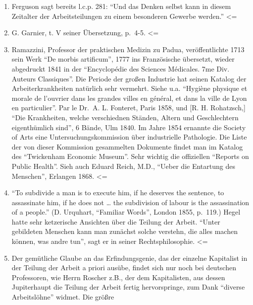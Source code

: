 {\begin{enumerate}
  A. Smith, Lemontey und Say in ihrer Kritik der Teilung der Arbeit
  gegeben und dort auch zuerst die manufakturmäßig Teilung der Arbeit
  als spezifische Form der kapitalistischen Produktionsweise
  dargestellt. (l.c.p. 122 sq. \textless{}Siehe Band, S.
  145-147\textgreater{}) \textless{}=
\item
  Ferguson sagt bereits l.c.p. 281: ``Und das Denken selbst kann in
  diesem Zeitalter der Arbeitsteilungen zu einem besonderen Gewerbe
  werden.'' \textless{}=
\item
  G. Garnier, t. V seiner Übersetzung, p.~4-5. \textless{}=
\item
  Ramazzini, Professor der praktischen Medizin zu Padua, veröffentlichte
  1713 sein Werk ``De morbis artificum'', 1777 ins Französische
  übersetzt, wieder abgedruckt 1841 in der ``Encyclopédie des Sciences
  Médicales. 7me Div. Auteurs Classiques''. Die Periode der großen
  Industrie hat seinen Katalog der Arbeiterkrankheiten natürlich sehr
  vermehrt. Siehe u.a. ``Hygiène physique et morale de l'ouvrier dans
  les grandes villes en général, et dans la ville de Lyon en
  particulier''. Par le Dr.~A. L. Fonteret, Paris 1858, und {[}R. H.
  Rohatzsch,{]} ``Die Krankheiten, welche verschiednen Ständen, Altern
  und Geschlechtern eigenthümlich sind'', 6 Bände, Ulm 1840. Im Jahre
  1854 ernannte die Society of Arts eine Untersuchungskommission über
  industrielle Pathologie. Die Liste der von dieser Kommission
  gesammelten Dokumente findet man im Katalog des ``Twickenham Economic
  Museum''. Sehr wichtig die offiziellen ``Reports on Public Health''.
  Sieh auch Eduard Reich, M.D., ``Ueber die Entartung des Menschen'',
  Erlangen 1868. \textless{}=
\item
  ``To subdivide a man is to execute him, if he deserves the sentence,
  to assassinate him, if he does not \ldots{} the subdivision of labour
  is the assassination of a people.'' (D. Urquhart, ``Familiar Words'',
  London 1855, p.~119.) Hegel hatte sehr ketzerische Ansichten über die
  Teilung der Arbeit. ``Unter gebildeten Menschen kann man zunächst
  solche verstehn, die alles machen können, was andre tun'', sagt er in
  seiner Rechtsphilosophie. \textless{}=
\item
  Der gemütliche Glaube an das Erfindungsgenie, das der einzelne
  Kapitalist in der Teilung der Arbeit a priori ausübe, findet sich nur
  noch bei deutschen Professoren, wie Herrn Roscher z.B., der dem
  Kapitalisten, aus dessen Jupiterhaupt die Teilung der Arbeit fertig
  hervorspringe, zum Dank ``diverse Arbeitslöhne'' widmet. Die größre

\end{enumerate}}
